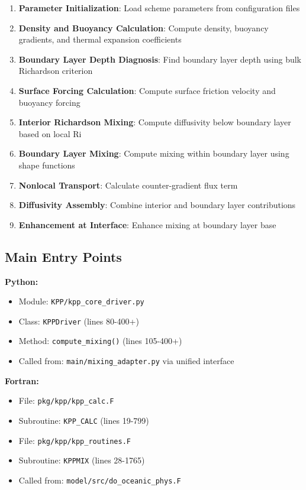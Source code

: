 \documentclass[11pt]{article}
\begin{document}
\begin{enumerate}
    \item \textbf{Parameter Initialization}: Load scheme parameters from configuration files
    \item \textbf{Density and Buoyancy Calculation}: Compute density, buoyancy gradients, and thermal expansion coefficients
    \item \textbf{Boundary Layer Depth Diagnosis}: Find boundary layer depth using bulk Richardson criterion
    \item \textbf{Surface Forcing Calculation}: Compute surface friction velocity and buoyancy forcing
    \item \textbf{Interior Richardson Mixing}: Compute diffusivity below boundary layer based on local Ri
    \item \textbf{Boundary Layer Mixing}: Compute mixing within boundary layer using shape functions
    \item \textbf{Nonlocal Transport}: Calculate counter-gradient flux term
    \item \textbf{Diffusivity Assembly}: Combine interior and boundary layer contributions
    \item \textbf{Enhancement at Interface}: Enhance mixing at boundary layer base
\end{enumerate}

\subsection{Main Entry Points}

\textbf{Python:}
\begin{itemize}
    \item Module: \verb|KPP/kpp_core_driver.py|
    \item Class: \verb|KPPDriver| (lines 80-400+)
    \item Method: \verb|compute_mixing()| (lines 105-400+)
    \item Called from: \verb|main/mixing_adapter.py| via unified interface
\end{itemize}

\textbf{Fortran:}
\begin{itemize}
    \item File: \verb|pkg/kpp/kpp_calc.F|
    \item Subroutine: \verb|KPP_CALC| (lines 19-799)
    \item File: \verb|pkg/kpp/kpp_routines.F|
    \item Subroutine: \verb|KPPMIX| (lines 28-1765)
    \item Called from: \verb|model/src/do_oceanic_phys.F|
\end{itemize}
\end{document}
